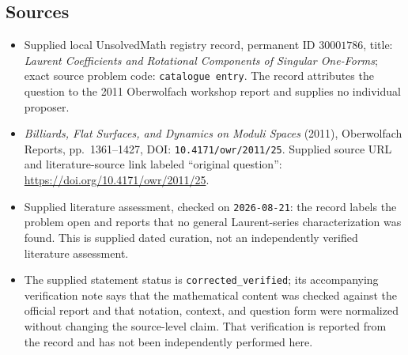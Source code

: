 \documentclass[11pt]{article}
\begin{document}
\subsection{Sources}
\begin{itemize}
\item Supplied local UnsolvedMath registry record, permanent ID \(30001786\), title: \emph{Laurent Coefficients and Rotational Components of Singular One-Forms}; exact source problem code: \texttt{catalogue entry}. The record attributes the question to the 2011 Oberwolfach workshop report and supplies no individual proposer.
\item \emph{Billiards, Flat Surfaces, and Dynamics on Moduli Spaces} (2011), Oberwolfach Reports, pp.~1361--1427, DOI: \texttt{10.4171/owr/2011/25}. Supplied source URL and literature-source link labeled ``original question'': \url{https://doi.org/10.4171/owr/2011/25}.
\item Supplied literature assessment, checked on \texttt{2026-08-21}: the record labels the problem open and reports that no general Laurent-series characterization was found. This is supplied dated curation, not an independently verified literature assessment.
\item The supplied statement status is \texttt{corrected\_verified}; its accompanying verification note says that the mathematical content was checked against the official report and that notation, context, and question form were normalized without changing the source-level claim. That verification is reported from the record and has not been independently performed here.
\end{itemize}
\end{document}
